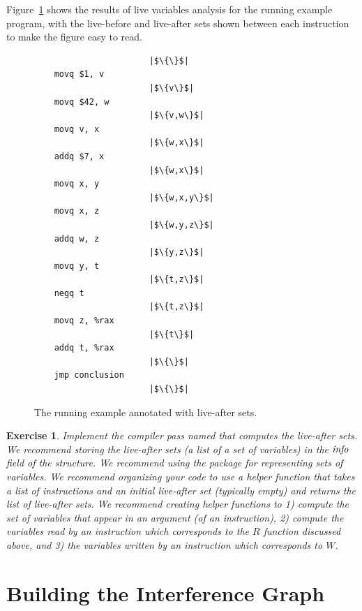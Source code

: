 \documentclass[11pt]{book}
\newtheorem{exercise}[theorem]{Exercise}
\begin{document}
Figure~\ref{fig:live-eg} shows the results of live variables analysis
for the running example program, with the live-before and live-after
sets shown between each instruction to make the figure easy to read.

\begin{figure}[tp]
\hspace{20pt}
\begin{minipage}{0.45\textwidth}
\begin{lstlisting}
                       |$\{\}$|    
    movq $1, v
                       |$\{v\}$|    
    movq $42, w
                       |$\{v,w\}$|    
    movq v, x
                       |$\{w,x\}$|    
    addq $7, x
                       |$\{w,x\}$|    
    movq x, y
                       |$\{w,x,y\}$|    
    movq x, z
                       |$\{w,y,z\}$|    
    addq w, z
                       |$\{y,z\}$|    
    movq y, t
                       |$\{t,z\}$|    
    negq t
                       |$\{t,z\}$|    
    movq z, %rax
                       |$\{t\}$|    
    addq t, %rax
                       |$\{\}$|
    jmp conclusion
                       |$\{\}$|
\end{lstlisting}
\end{minipage}

\caption{The running example annotated with live-after sets.}
\label{fig:live-eg}
\end{figure}

\begin{exercise}\normalfont
Implement the compiler pass named  that computes
the live-after sets. We recommend storing the live-after sets (a list
of a set of variables) in the $\mathit{info}$ field of the 
structure. We recommend using the
\href{https://docs.racket-lang.org/reference/sets.html}{}
package for representing sets of variables.
%
We recommend organizing your code to use a helper function that takes
a list of instructions and an initial live-after set (typically empty)
and returns the list of live-after sets.
%
We recommend creating helper functions to 1) compute the set of
variables that appear in an argument (of an instruction), 2) compute
the variables read by an instruction which corresponds to the $R$
function discussed above, and 3) the variables written by an
instruction which corresponds to $W$.
\end{exercise}


\section{Building the Interference Graph}
\label{sec:build-interference}
\end{document}
